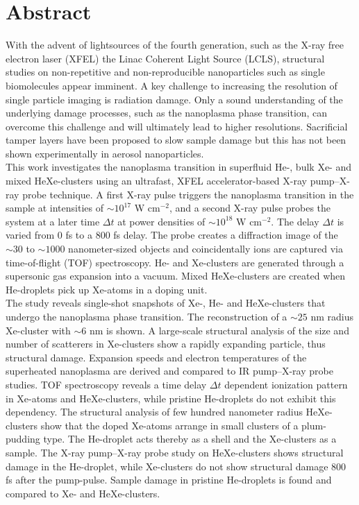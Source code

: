 \section*{Abstract}\label{ch:abstract}
With the advent of lightsources of the fourth generation, such as the X-ray free electron laser (XFEL) the Linac Coherent Light Source (LCLS), structural studies on non-repetitive and non-reproducible nanoparticles such as single biomolecules appear imminent. A key challenge to increasing the resolution of single particle imaging is radiation damage. Only a sound understanding of the underlying damage processes, such as the nanoplasma phase transition, can overcome this challenge and will ultimately lead to higher resolutions. Sacrificial tamper layers have been proposed to slow sample damage but this has not been shown experimentally in aerosol nanoparticles.\\[1\baselineskip]
This work investigates the nanoplasma transition in superfluid He-, bulk Xe- and mixed HeXe-clusters using an ultrafast, XFEL accelerator-based X-ray pump--X-ray probe technique. A first X-ray pulse triggers the nanoplasma transition in the sample at intensities of $\sim 10^{17}$ W cm$^{-2}$, and a second X-ray pulse probes the system at a later time $\Delta t$ at power densities of $\sim 10^{18}$ W cm$^{-2}$. The delay $\Delta t$ is varied from 0 fs to a 800 fs delay. The probe creates a diffraction image of the $\sim 30$ to $\sim 1000$ nanometer-sized objects and coincidentally ions are captured via time-of-flight (TOF) spectroscopy. He- and Xe-clusters are generated through a supersonic gas expansion into a vacuum. Mixed HeXe-clusters are created when He-droplets pick up Xe-atoms in a doping unit.\\[1\baselineskip]
The study reveals single-shot snapshots of Xe-, He- and HeXe-clusters that undergo the nanoplasma phase transition. The reconstruction of a $\sim 25$ nm radius Xe-cluster with $\sim 6$ nm is shown. A large-scale structural analysis of the size and number of scatterers in Xe-clusters show a rapidly expanding particle, thus structural damage. Expansion speeds and electron temperatures of the superheated nanoplasma are derived and compared to IR pump--X-ray probe studies. TOF spectroscopy reveals a time delay $\Delta t$ dependent ionization pattern in Xe-atoms and HeXe-clusters, while pristine He-droplets do not exhibit this dependency. The structural analysis of few hundred nanometer radius HeXe-clusters show that the doped Xe-atoms arrange in small clusters of a plum-pudding type. The He-droplet acts thereby as a shell and the Xe-clusters as a sample. The X-ray pump--X-ray probe study on HeXe-clusters shows structural damage in the He-droplet, while Xe-clusters do not show structural damage 800 fs after the pump-pulse. Sample damage in pristine He-droplets is found and compared to Xe- and HeXe-clusters.
%
%
%
%